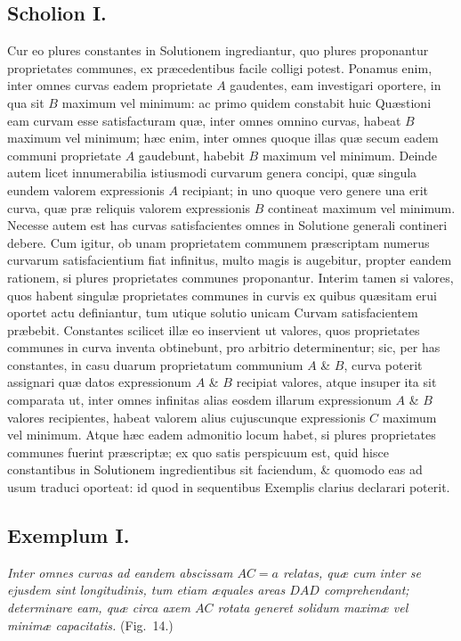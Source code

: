 \subsection*{Scholion I.}
Cur eo plures constantes in Solutionem ingrediantur, quo plures proponantur proprietates communes, ex præcedentibus facile colligi potest. Ponamus enim, inter omnes curvas eadem proprietate $A$ gaudentes, eam investigari oportere, in qua sit $B$ maximum vel minimum: ac primo quidem constabit huic Quæstioni eam curvam esse satisfacturam quæ, inter omnes omnino curvas, habeat $B$ maximum vel minimum; hæc enim, inter omnes quoque illas quæ secum eadem communi proprietate $A$ gaudebunt, habebit $B$ maximum vel minimum. Deinde autem licet innumerabilia istiusmodi curvarum genera concipi, quæ singula eundem valorem expressionis $A$ recipiant; in uno quoque vero genere una erit curva, quæ præ reliquis valorem expressionis $B$ contineat maximum vel minimum. Necesse autem est has curvas satisfacientes omnes in Solutione generali contineri debere. Cum igitur, ob unam proprietatem communem præscriptam numerus curvarum satisfacientium fiat infinitus, multo magis is augebitur, propter eandem rationem, si plures proprietates communes proponantur. Interim tamen si valores, quos habent singulæ proprietates communes in curvis ex quibus quæsitam erui oportet actu definiantur, tum utique solutio unicam Curvam satisfacientem præbebit. Constantes scilicet illæ eo inservient ut valores, quos proprietates communes in curva inventa obtinebunt, pro arbitrio determinentur; sic, per has constantes, in casu duarum proprietatum communium $A$ \& $B$, curva poterit assignari quæ datos expressionum $A$ \& $B$ recipiat valores, atque insuper ita sit comparata ut, inter omnes infinitas alias eosdem illarum expressionum $A$ \& $B$ valores recipientes, habeat valorem alius cujuscunque expressionis $C$ maximum vel minimum. Atque hæc eadem admonitio locum habet, si plures proprietates communes fuerint præscriptæ; ex quo satis perspicuum est, quid hisce constantibus in Solutionem ingredientibus sit faciendum, \& quomodo eas ad usum traduci oporteat: id quod in sequentibus Exemplis clarius declarari poterit.
\subsection*{Exemplum I.}
\textit{Inter omnes curvas ad eandem abscissam $AC=a$ relatas, quæ cum inter se ejusdem sint longitudinis, tum etiam æquales areas $DAD$ comprehendant; determinare eam, quæ circa axem $AC$ rotata generet solidum maximæ vel minimæ capacitatis.} (Fig.~14.)

